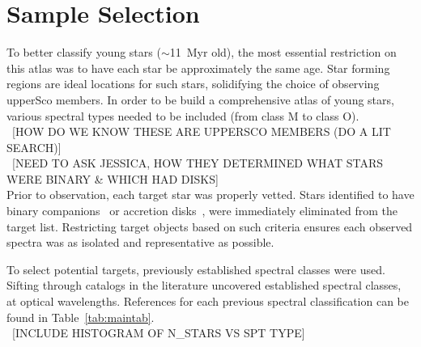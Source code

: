 \section{Sample Selection}


To better classify young stars ($\sim$11~Myr old), 
the most essential restriction on this atlas was to 
have each star be approximately the same age. 
Star forming regions are ideal locations for such stars, 
solidifying the choice of observing upperSco members.  In 
order to be build a comprehensive atlas of young stars, various
spectral types needed to be included (from class M to class O).\\

~[HOW DO WE KNOW THESE ARE UPPERSCO MEMBERS (DO A LIT SEARCH)]\\



~[NEED TO ASK JESSICA, HOW THEY DETERMINED WHAT STARS WERE BINARY & WHICH HAD DISKS]\\

Prior to observation, each target star was properly vetted. 
Stars identified to have binary companions~\cite{binary_guy} or accretion 
disks~\cite{binary_guy}, were immediately eliminated from the target list.  
Restricting target objects based on such criteria ensures each observed 
spectra was as isolated and representative as possible.



To select potential targets, previously established spectral classes 
were used.  
Sifting through catalogs in the literature uncovered established 
spectral classes, at optical wavelengths.    
References for each previous spectral classification 
can be found in Table~\ref{tab:maintab}.\\
~[INCLUDE HISTOGRAM OF N_STARS VS SPT TYPE]











